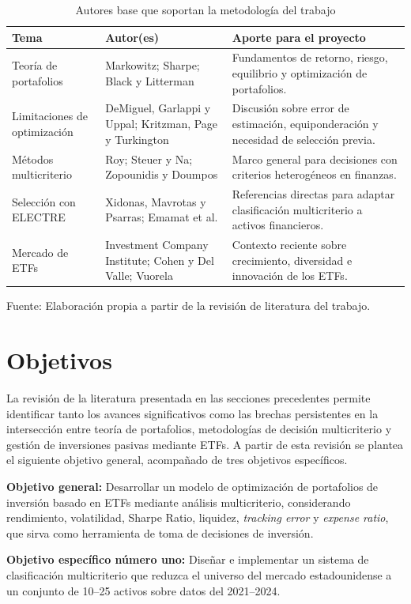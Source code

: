 \documentclass[12pt,letterpaper]{article}
\newcommand{\fuente}[1]{\begin{center}\small Fuente: #1\end{center}}
\begin{document}
\begin{longtable}{p{3.2cm}p{3.2cm}p{6.4cm}}
\caption{Autores base que soportan la metodología del trabajo}\label{tab:literatura_base}\\
\toprule
\textbf{Tema} & \textbf{Autor(es)} & \textbf{Aporte para el proyecto} \\
\midrule
Teoría de portafolios & Markowitz; Sharpe; Black y Litterman & Fundamentos de retorno, riesgo, equilibrio y optimización de portafolios. \\
Limitaciones de optimización & DeMiguel, Garlappi y Uppal; Kritzman, Page y Turkington & Discusión sobre error de estimación, equiponderación y necesidad de selección previa. \\
Métodos multicriterio & Roy; Steuer y Na; Zopounidis y Doumpos & Marco general para decisiones con criterios heterogéneos en finanzas. \\
Selección con ELECTRE & Xidonas, Mavrotas y Psarras; Emamat et al. & Referencias directas para adaptar clasificación multicriterio a activos financieros. \\
Mercado de ETFs & Investment Company Institute; Cohen y Del Valle; Vuorela & Contexto reciente sobre crecimiento, diversidad e innovación de los ETFs. \\
\bottomrule
\end{longtable}
\fuente{Elaboración propia a partir de la revisión de literatura del trabajo.}

\clearpage
\section{Objetivos}

La revisión de la literatura presentada en las secciones precedentes permite identificar tanto los avances significativos como las brechas persistentes en la intersección entre teoría de portafolios, metodologías de decisión multicriterio y gestión de inversiones pasivas mediante ETFs. A partir de esta revisión se plantea el siguiente objetivo general, acompañado de tres objetivos específicos.

\textbf{Objetivo general:} Desarrollar un modelo de optimización de portafolios de inversión basado en ETFs mediante análisis multicriterio, considerando rendimiento, volatilidad, Sharpe Ratio, liquidez, \textit{tracking error} y \textit{expense ratio}, que sirva como herramienta de toma de decisiones de inversión.

\textbf{Objetivo específico número uno:} Diseñar e implementar un sistema de clasificación multicriterio que reduzca el universo del mercado estadounidense a un conjunto de 10--25 activos sobre datos del 2021--2024.
\end{document}
